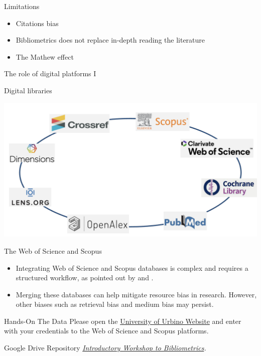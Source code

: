 \documentclass[
  ignorenonframetext,
]{beamer}
\begin{document}
\begin{frame}{Limitations}
\protect\hypertarget{limitations}{}
\begin{itemize}
\item
  Citations bias
\item
  Bibliometrics does not replace in-depth reading the literature
\item
  The Mathew effect
\end{itemize}
\end{frame}

\begin{frame}{The role of digital platforms I}
\protect\hypertarget{the-role-of-digital-platforms-i}{}
\begin{block}{Digital libraries}
\protect\hypertarget{digital-libraries}{}
\begin{center}
\includegraphics[width=1\textwidth]{pic_4.png}
\end{center}
\end{block}
\end{frame}

\begin{frame}{The Web of Science and Scopus}
\protect\hypertarget{the-web-of-science-and-scopus}{}
\begin{itemize}
\item
  Integrating Web of Science and Scopus databases is complex and
  requires a structured workflow, as pointed out by
  \citet{echchakoui2020} and \citet{caputo2022}.
\item
  Merging these databases can help mitigate resource bias in research.
  However, other biases such as retrieval bias and medium bias may
  persist.
\end{itemize}
\end{frame}

\begin{frame}{Hands-On The Data}
\protect\hypertarget{hands-on-the-data}{}
Please open the \href{https://www.uniurb.it/}{University of Urbino
Website} and enter with your credentials to the Web of Science and
Scopus platforms.

Google Drive Repository
\href{https://drive.google.com/drive/folders/1Mw6cWYZZxRlZTQAUYZofifyY_xkmcVeK}{\emph{Introductory
Workshop to Bibliometrics}}\emph{.}
\end{frame}
\end{document}
